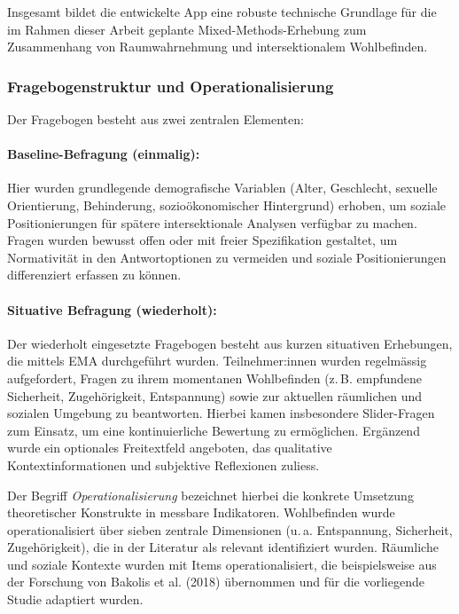 \medskip
Insgesamt bildet die entwickelte App eine robuste technische Grundlage für die im Rahmen dieser Arbeit geplante Mixed-Methods-Erhebung zum Zusammenhang von Raumwahrnehmung und intersektionalem Wohlbefinden.

\subsubsection{Fragebogenstruktur und Operationalisierung}

Der Fragebogen besteht aus zwei zentralen Elementen:

\paragraph{Baseline-Befragung (einmalig):}
Hier wurden grundlegende demografische Variablen (Alter, Geschlecht, sexuelle Orientierung, Behinderung, sozioökonomischer Hintergrund) erhoben, um soziale Positionierungen für spätere intersektionale Analysen verfügbar zu machen. Fragen wurden bewusst offen oder mit freier Spezifikation gestaltet, um Normativität in den Antwortoptionen zu vermeiden und soziale Positionierungen differenziert erfassen zu können.

\paragraph{Situative Befragung (wiederholt):}
Der wiederholt eingesetzte Fragebogen besteht aus kurzen situativen Erhebungen, die mittels EMA durchgeführt wurden. Teilnehmer:innen wurden regelmässig aufgefordert, Fragen zu ihrem momentanen Wohlbefinden (z.\,B. empfundene Sicherheit, Zugehörigkeit, Entspannung) sowie zur aktuellen räumlichen und sozialen Umgebung zu beantworten. Hierbei kamen insbesondere Slider-Fragen zum Einsatz, um eine kontinuierliche Bewertung zu ermöglichen. Ergänzend wurde ein optionales Freitextfeld angeboten, das qualitative Kontextinformationen und subjektive Reflexionen zuliess.

Der Begriff \emph{Operationalisierung} bezeichnet hierbei die konkrete Umsetzung theoretischer Konstrukte in messbare Indikatoren. Wohlbefinden wurde operationalisiert über sieben zentrale Dimensionen (u.\,a. Entspannung, Sicherheit, Zugehörigkeit), die in der Literatur als relevant identifiziert wurden. Räumliche und soziale Kontexte wurden mit Items operationalisiert, die beispielsweise aus der Forschung von Bakolis et al. (2018) übernommen und für die vorliegende Studie adaptiert wurden.

